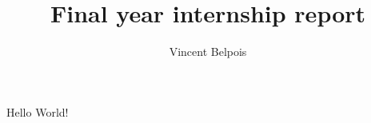 \documentclass[]{article}
\title{Final year internship report}
\author{Vincent Belpois}
\begin{document}
Hello World!
\end{document}
